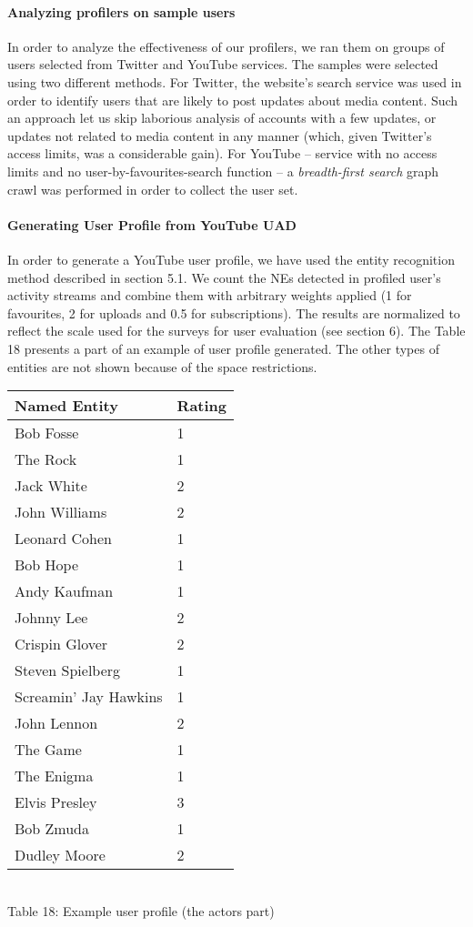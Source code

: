\paragraph{Analyzing profilers on sample users}
In order to analyze the effectiveness of our profilers, we ran them on groups of
users selected from Twitter and YouTube services. The samples were selected
using two different methods. For Twitter, the website's search service was used
in order to identify users that are likely to post updates about media content.
Such an approach let us skip laborious analysis of accounts with a few updates,
or updates not related to media content in any manner (which,
given Twitter's access limits, was a considerable gain). For YouTube -- service
with no access limits and no user-by-favourites-search function -- a \textit{breadth-first search}
graph crawl was performed in order to collect the user set.

\paragraph{Generating User Profile from YouTube UAD}

In order to generate a YouTube user profile, we have used the entity
recognition method described in section 5.1. We count the NEs detected in
profiled user's activity streams and combine them with arbitrary weights applied
(1 for favourites, 2 for uploads and 0.5 for subscriptions). The results are
normalized to reflect the scale used for the surveys for user evaluation (see section 6).
The Table 18
presents a part of an example of user profile generated. The other types of
entities are not shown because of the space restrictions.

\begin{center}
  \begin{tabular}{| l | l |}
Named Entity & Rating \\ \hline
Bob Fosse & 1 \\
The Rock & 1 \\
Jack White & 2 \\
John Williams & 2 \\
Leonard Cohen & 1 \\
Bob Hope & 1 \\
Andy Kaufman & 1 \\
Johnny Lee & 2 \\
Crispin Glover & 2 \\
Steven Spielberg & 1 \\
Screamin' Jay Hawkins & 1 \\
John Lennon & 2 \\
The Game & 1 \\
The Enigma & 1 \\
Elvis Presley & 3 \\
Bob Zmuda & 1 \\
Dudley Moore & 2 \\
  \end{tabular} \\
  Table 18: Example user profile (the actors part)
\end{center}

